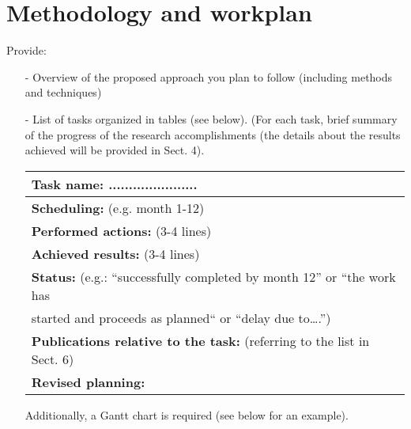 \section{Methodology and workplan}

Provide: 
\begin{itemize}
	\item[-] Overview of the proposed approach you plan to follow (including methods and techniques)
	\item[-] List of tasks organized in tables (see below). (For each task, brief summary of the progress of the research accomplishments (the details about the results achieved will be provided in Sect. 4). 
	
	\begin{table}[h]
		\begin{center}
			\renewcommand{\arraystretch}{1.3} %
			\setlength{\tabcolsep}{8pt} %
			\begin{tabular}{|P{15cm}|}
				\hline
				\textbf{Task name: ......................} \\ \hline
				\textbf{Scheduling: }(e.g. month 1-12) \\ \hline
				\textbf{Performed actions: }(3-4 lines)\\
				\hline
    				\textbf{Achieved results: }(3-4 lines)\\
				\hline
				\textbf{Status: }(e.g.: “successfully completed by month 12” or “the work has \\ started and proceeds as planned“ or “delay due to….”)\\
				\hline
				\textbf{Publications relative to the task: } (referring to the list in Sect. 6)\\
				\hline
				\textbf{Revised planning: }\\
				\hline
			\end{tabular}
		\end{center}
	\end{table}
	Additionally, a Gantt chart is required (see below for an example).
	\begin{figure}[h]
		\begin{center}
			\scalebox{0.8}{ %
			\begin{ganttchart}[
				canvas/.append style={fill=none, draw=black!5, line width=.75pt},
				hgrid style/.style={draw=black!40, line width=1.0pt},
				vgrid={*1{draw=black!40, line width=1.0pt}},
				today=11,
				today rule/.style={
					draw=black,
}
\end{ganttchart}}
\end{center}
\end{figure}
\end{itemize}
